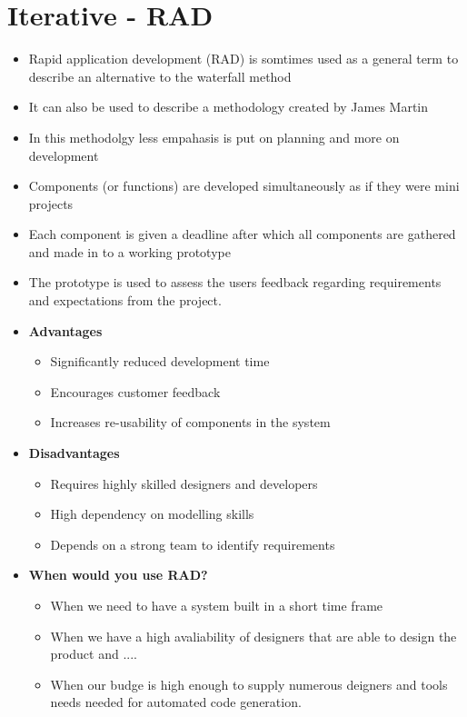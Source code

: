 \documentclass[12pt, a4, twoside]{article}
\begin{document}
  \section{Iterative - RAD}
  \begin{itemize}
    \item Rapid application development (RAD) is somtimes used as a general term to describe an alternative to the waterfall method
    \item It can also be used to describe a methodology created by James Martin
    \item In this methodolgy less empahasis is put on planning and more on development
    \item Components (or functions) are developed simultaneously as if they were mini projects
    \item Each component is given a deadline after which all components are gathered and made in to a working prototype
    \item The prototype is used to assess the users feedback regarding requirements and expectations from the project.
    \item \textbf{Advantages}
    \begin{itemize}
      \item Significantly reduced development time
      \item Encourages customer feedback
      \item Increases re-usability of components in the system
    \end{itemize}
    \item \textbf{Disadvantages}
    \begin{itemize}
      \item Requires highly skilled designers and developers
      \item High dependency on modelling skills
      \item Depends on a strong team to identify requirements
    \end{itemize}
    \item \textbf{When would you use RAD?}
    \begin{itemize}
      \item When we need to have a system built in a short time frame
      \item When we have a high avaliability of designers that are able to design the product and ....
      \item When our budge is high enough to supply numerous deigners and tools needs needed for automated code generation.
    \end{itemize}
  \end{itemize}
\end{document}
